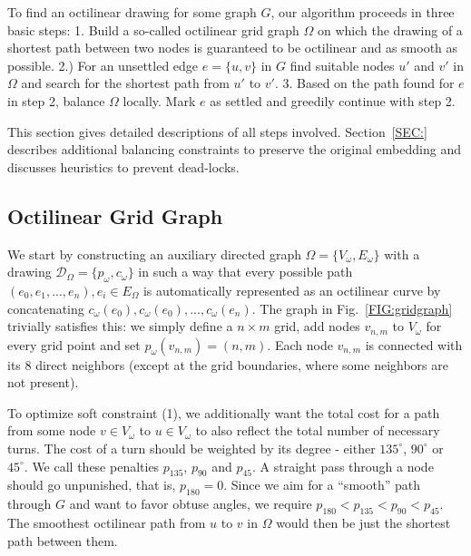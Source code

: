 \documentclass{sig-alternate-sigmod09}
\begin{document}
To find an octilinear drawing for some graph $G$, our algorithm proceeds in three basic steps: 1. Build a so-called octilinear grid graph $\Omega$ on which the drawing of a shortest path between two nodes is guaranteed to be octilinear and as smooth as possible. 2.) For an unsettled edge $e = \{u, v\}$ in $G$ find suitable nodes $u'$ and $v'$ in $\Omega$ and search for the shortest path from $u'$ to $v'$. 3. Based on the path found for $e$ in step 2, balance $\Omega$ locally. Mark $e$ as settled and greedily continue with step 2.

This section gives detailed descriptions of all steps involved. Section~\ref{SEC:} describes additional balancing constraints to preserve the original embedding and discusses heuristics to prevent dead-locks.

\subsection{Octilinear Grid Graph}

We start by constructing an auxiliary directed graph $\Omega = \{V_\omega, E_\omega\}$ with a drawing $\mathcal{D}_\Omega = \{p_\omega, c_\omega\}$ in such a way that every possible path $(e_0, e_1, ..., e_n), e_i \in E_\Omega$ is automatically represented as an octilinear curve by concatenating $c_\omega(e_0), c_\omega(e_0),...,c_\omega(e_n)$. The graph in Fig.~\ref{FIG:gridgraph} trivially satisfies this: we simply define a $n\times m$ grid, add nodes $v_{n,m}$ to $V_\omega$ for every grid point and set $p_\omega(v_{n,m}) = (n, m)$. Each node $v_{n,m}$ is connected with its 8 direct neighbors (except at the grid boundaries, where some neighbors are not present).


To optimize soft constraint (1), we additionally want the total cost for a path from some node $v \in V_\omega$ to $u \in V_\omega$ to also reflect the total number of necessary turns. The cost of a turn should be weighted by its degree - either $135^{\circ}$, $90^{\circ}$ or $45^{\circ}$. We call these penalties $p_{135}$, $p_{90}$ and $p_{45}$. A straight pass through a node should go unpunished, that is, $p_{180} = 0$. Since we aim for a ``smooth'' path through $G$ and want to favor obtuse angles, we require $p_{180} < p_{135} < p_{90} < p_{45}$. The smoothest octilinear path from $u$ to $v$ in $\Omega$ would then be just the shortest path between them.
\end{document}
